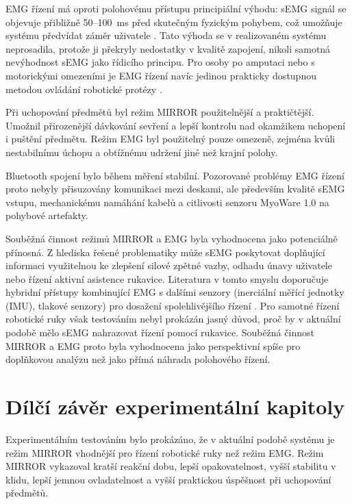 \documentclass[FZS,DP]{tulthesis}
\begin{document}
EMG řízení má oproti polohovému přístupu principiální výhodu: sEMG signál se objevuje přibližně 50--100~ms před skutečným fyzickým pohybem, což umožňuje systému předvídat záměr uživatele \cite{Song2023823,Xiong2024}. Tato výhoda se v realizovaném systému neprosadila, protože ji překryly nedostatky v kvalitě zapojení, nikoli samotná nevýhodnost sEMG jako řídicího principu. Pro osoby po amputaci nebo s motorickými omezeními je EMG řízení navíc jedinou prakticky dostupnou metodou ovládání robotické protézy \cite{Brazdil2020,Najman2017}.

Při uchopování předmětů byl režim MIRROR použitelnější a praktičtější. Umožnil přirozenější dávkování sevření a lepší kontrolu nad okamžikem uchopení i puštění předmětu. Režim EMG byl použitelný pouze omezeně, zejména kvůli nestabilnímu úchopu a obtížnému udržení jiné než krajní polohy.

Bluetooth spojení bylo během měření stabilní. Pozorované problémy EMG řízení proto nebyly přisuzovány komunikaci mezi deskami, ale především kvalitě sEMG vstupu, mechanickému namáhání kabelů a citlivosti senzoru MyoWare 1.0 na pohybové artefakty.

Souběžná činnost režimů MIRROR a EMG byla vyhodnocena jako potenciálně přínosná. Z hlediska řešené problematiky může sEMG poskytovat doplňující informaci využitelnou ke zlepšení silové zpětné vazby, odhadu únavy uživatele nebo řízení aktivní asistence rukavice. Literatura v tomto smyslu doporučuje hybridní přístupy kombinující EMG s dalšími senzory (inerciální měřící jednotky (IMU), tlakové senzory) pro dosažení spolehlivějšího řízení \cite{Sul2025627,Xiong2024}. Pro samotné řízení robotické ruky však testováním nebyl prokázán jasný důvod, proč by v aktuální podobě mělo sEMG nahrazovat řízení pomocí rukavice. Souběžná činnost MIRROR a EMG proto byla vyhodnocena jako perspektivní spíše pro doplňkovou analýzu než jako přímá náhrada polohového řízení.

\section{Dílčí závěr experimentální kapitoly}
\label{sec:dilci-zaver-experimenty}

Experimentálním testováním bylo prokázáno, že v aktuální podobě systému je režim MIRROR vhodnější pro řízení robotické ruky než režim EMG\@. Režim MIRROR vykazoval kratší reakční dobu, lepší opakovatelnost, vyšší stabilitu v klidu, lepší jemnou ovladatelnost a vyšší praktickou úspěšnost při uchopování předmětů.
\end{document}
